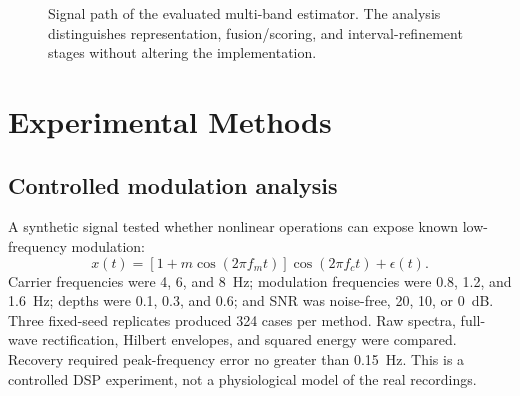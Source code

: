 \documentclass[10pt,twocolumn]{article}
\begin{document}
\begin{figure}[t]
\centering
{}
\caption{Signal path of the evaluated multi-band estimator. The analysis distinguishes representation, fusion/scoring, and interval-refinement stages without altering the implementation.}
\label{fig:pipeline}
\end{figure}

\section{Experimental Methods}
\subsection{Controlled modulation analysis}
A synthetic signal tested whether nonlinear operations can expose known low-frequency modulation:
\begin{equation}
x(t)=[1+m\cos(2\pi f_m t)]\cos(2\pi f_c t)+\epsilon(t).
\end{equation}
Carrier frequencies were 4, 6, and 8~Hz; modulation frequencies were 0.8, 1.2, and 1.6~Hz; depths were 0.1, 0.3, and 0.6; and SNR was noise-free, 20, 10, or 0~dB. Three fixed-seed replicates produced 324 cases per method. Raw spectra, full-wave rectification, Hilbert envelopes, and squared energy were compared. Recovery required peak-frequency error no greater than 0.15~Hz. This is a controlled DSP experiment, not a physiological model of the real recordings.
\end{document}
